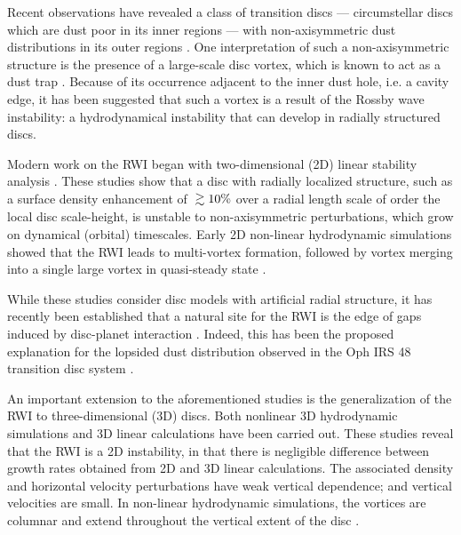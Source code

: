 \documentclass[useAMS,usenatbib]{mn2e}
\newcommand{\gtrsim}{\;\raisebox{-.8ex}{$\buildrel{\textstyle>}\over\sim$}\;}
\begin{document}

Recent observations have revealed a class of transition discs ---
circumstellar discs which are dust poor in its inner regions ---  
with non-axisymmetric dust distributions in its outer 
regions \citep{brown09,mayama12,marel13,isella13}.  
One interpretation of such a non-axisymmetric structure is the presence of
a large-scale disc vortex, which is known to act as a dust trap
\citep{barge95,inaba06,birnstiel13,ataiee13,lyra13}.  
Because of its occurrence adjacent to the inner dust
hole, i.e. a cavity edge, it has been suggested that such a vortex is
a result of the Rossby wave instability: a hydrodynamical instability
that can develop in radially structured discs.  

Modern work on the RWI began with two-dimensional (2D) linear
stability analysis \citep{lovelace99,li00}. These studies show that a
disc with radially localized 
structure, such as a surface density enhancement of $\gtrsim 10\%$ over a
radial length scale of order the local disc scale-height, is unstable to
non-axisymmetric perturbations, which grow on dynamical (orbital)
timescales. Early 2D non-linear hydrodynamic simulations showed that
the RWI leads to multi-vortex formation, followed by vortex merging into
a single large vortex in quasi-steady state \citep{li01,inaba06}. 

While these studies consider disc models with artificial radial
structure, it has recently been established that a natural site for
the RWI is the edge of gaps induced by disc-planet interaction 
\citep{koller03,li05,valborro07,li09,lyra09b,lin10,lin11a}. Indeed, this has
been the proposed explanation for the lopsided dust distribution
observed in the Oph IRS 48 transition disc system \citep{marel13}.       

An important extension to the aforementioned studies is
the generalization of the RWI to three-dimensional (3D) 
discs. Both nonlinear 3D hydrodynamic simulations 
\citep{meheut10,meheut12b,lin12b,lyra12} and 3D linear calculations
\citep{umurhan10,meheut12,lin12,lin13} have been carried out. 
These studies reveal that the RWI is a 2D instability,
in that there is negligible difference between growth rates obtained
from 2D and 3D linear calculations. The associated density and
horizontal velocity perturbations have weak vertical dependence; and  
vertical velocities are small. In non-linear hydrodynamic simulations,
the vortices are columnar and extend throughout the vertical extent of
the disc \citep{richard13}.  
\end{document}
